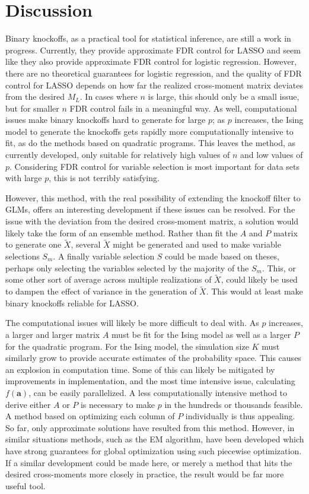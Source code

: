 \documentclass[11pt]{article}
\theoremstyle{definition}
\begin{document}
\section{Discussion}
    Binary knockoffs, as a practical tool for statistical inference, are still a work in progress. Currently, they provide approximate FDR control for LASSO and seem like they also provide approximate FDR control for logistic regression. However, there are no theoretical guarantees for logistic regression, and the quality of FDR control for LASSO depends on how far the realized cross-moment matrix deviates from the desired $M_L$. In cases where $n$ is large, this should only be a small issue, but for smaller $n$ FDR control fails in a meaningful way. As well, computational issues make binary knockoffs hard to generate for large $p$; as $p$ increases, the Ising model to generate the knockoffs gets rapidly more computationally intensive to fit, as do the methods based on quadratic programs. This leaves the method, as currently developed, only suitable for relatively high values of $n$ and low values of $p$. Considering FDR control for variable selection is most important for data sets with large $p$, this is not terribly satisfying. \par
    However, this method, with the real possibility of extending the knockoff filter to GLMs, offers an interesting development if these issues can be resolved. For the issue with the deviation from the desired cross-moment matrix, a solution would likely take the form of an ensemble method. Rather than fit the $A$ and $P$ matrix to generate one $\tilde X$, several $\tilde X$ might be generated and used to make variable selections $S_m$. A finally variable selection $S$ could be made based on theses, perhaps only selecting the variables selected by the majority of the $S_m$. This, or some other sort of average across multiple realizations of $\tilde X$, could likely be used to dampen the effect of variance in the generation of $\tilde X$. This would at least make binary knockoffs reliable for LASSO. \par
    The computational issues will likely be more difficult to deal with. As $p$ increases, a larger and larger matrix $A$ must be fit for the Ising model as well as a larger $P$ for the quadratic program. For the Ising model, the simulation size $K$ must similarly grow to provide accurate estimates of the probability space. This causes an explosion in computation time. Some of this can likely be mitigated by improvements in implementation, and the most time intensive issue, calculating $f(\mathbf a)$, can be easily parallelized. A less computationally intensive method to derive either $A$ or $P$ is necessary to make $p$ in the hundreds or thousands feasible. A method based on optimizing each column of $P$ individually is thus appealing. So far, only approximate solutions have resulted from this method. However, in similar situations methods, such as the EM algorithm, have been developed which have strong guarantees for global optimization using such piecewise optimization. If a similar development could be made here, or merely a method that hits the desired cross-moments more closely in practice, the result would be far more useful tool. \par
\end{document}
